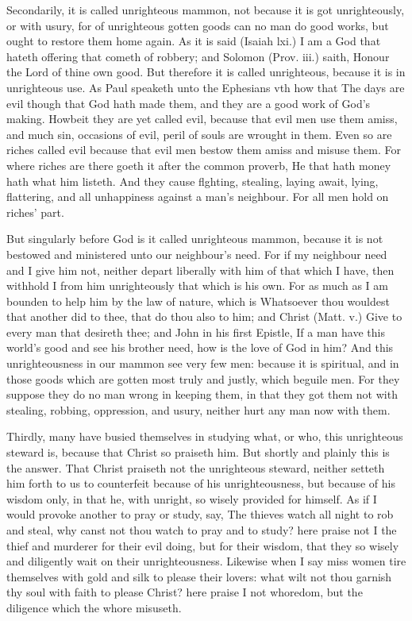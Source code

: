 Secondarily, it is called unrighteous mammon, not because
it is got unrighteously, or with usury, for of unrighteous 
gotten goods can no man do good works, but ought to restore
them home again. As it is said (Isaiah lxi.) I am a 
God that hateth offering that cometh of robbery; and Solomon
(Prov. iii.) saith, Honour the Lord of thine own good. 
But therefore it is called unrighteous, because it is in unrighteous
use. As Paul speaketh unto the Ephesians vth 
how that The days are evil though that God hath made 
them, and they are a good work of God's making. Howbeit
they are yet called evil, because that evil men use them 
amiss, and much sin, occasions of evil, peril of souls are 
wrought in them. Even so are riches called evil because 
that evil men bestow them amiss and misuse them. For 
where riches are there goeth it after the common proverb, 
He that hath money hath what him listeth. And they cause 
flghting, stealing, laying await, lying, flattering, and all unhappiness
against a man's neighbour. For all men hold on 
riches' part. 

But singularly before God is it called unrighteous mammon,
because it is not bestowed and ministered unto our 
neighbour's need. For if my neighbour need and I give him 
not, neither depart liberally with him of that which I have, 
then withhold I from him unrighteously that which is his 
own. For as much as I am bounden to help him by the law 
of nature, which is Whatsoever thou wouldest that another 
did to thee, that do thou also to him; and Christ (Matt. v.) 
Give to every man that desireth thee; and John in his first 
Epistle, If a man have this world's good and see his brother 
need, how is the love of God in him? And this unrighteousness
in our mammon see very few men: because it is spiritual,
and in those goods which are gotten most truly and 
justly, which beguile men. For they suppose they do no man 
wrong in keeping them, in that they got them not with 
stealing, robbing, oppression, and usury, neither hurt any 
man now with them. 

Thirdly, many have busied themselves in studying what, 
or who, this unrighteous steward is, because that Christ so 
praiseth him. But shortly and plainly this is the answer. That 
Christ praiseth not the unrighteous steward, neither setteth 
him forth to us to counterfeit because of his unrighteousness, 
but because of his wisdom only, in that he, with unright, so 
wisely provided for himself. As if I would provoke another 
to pray or study, say, The thieves watch all night to rob 
and steal, why canst not thou watch to pray and to study? 
here praise not I the thief and murderer for their evil doing, 
but for their wisdom, that they so wisely and diligently wait 
on their unrighteousness. Likewise when I say miss women 
tire themselves with gold and silk to please their lovers: 
what wilt not thou garnish thy soul with faith to please 
Christ? here praise I not whoredom, but the diligence 
which the whore misuseth. 

